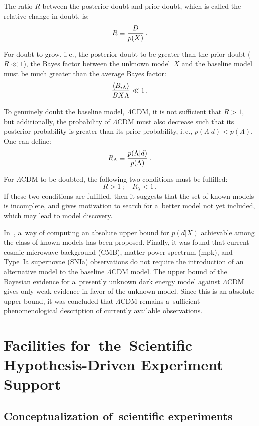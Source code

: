 \begin{multicols}{2}
  The ratio $R$ between the posterior doubt and prior doubt,
  which is called the relative change in doubt, is:
  $$
  R\equiv \displaystyle\frac{\displaystyle D\mathstrut}{\displaystyle p(X)\mathstrut}\,.
  $$

  For doubt to grow, i.\,e., the posterior doubt to be
  greater than the prior doubt ($R\ll 1$), the Bayes factor between
  the unknown model~$X$ and the baseline model must be much greater
  than the average Bayes factor:
  $$
  \displaystyle\frac{\displaystyle \langle B_{i\Lambda}\rangle\mathstrut}{\displaystyle BX\Lambda\mathstrut} \ll 1\,.
  $$

  To genuinely doubt the baseline model, $\Lambda$CDM, it is not sufficient that
$R > 1$, but additionally, the probability of $\Lambda$CDM must also decrease
such that its posterior probability is greater than its prior probability, i.\,e.,
$p(\Lambda \vert d) < p(\Lambda)$. One can define:
  $$
  R_\Lambda \equiv \displaystyle\frac{\displaystyle p(\Lambda\vert d)\mathstrut}{\displaystyle p(\Lambda)\mathstrut}\,.
  $$

  For $\Lambda$CDM to be doubted, the following two conditions must be fulfilled:
  $$
  R>1\,;\quad R_\lambda <1\,.
  $$
  If these two conditions are fulfilled, then it suggests that the set of
  known models is incomplete, and gives motivation to search for a~better
  model not yet included, which may lead to model discovery.

  In~\cite{41-kl}, a~way of computing an absolute upper bound for $p(d\vert X)$
achievable among the class of known models  has been proposed. Finally, it was
found that current cosmic microwave background (CMB), matter power spectrum
(mpk), and Type~Ia supernovae (SNIa) observations do not require the introduction of
an alternative model to the baseline $\Lambda$CDM model. The upper bound of the Bayesian evidence for a~presently unknown dark energy model against
$\Lambda$CDM gives only weak evidence in favor of the unknown model. Since
this is an absolute upper bound, it was concluded that $\Lambda$CDM remains a~sufficient phenomenological description of currently available observations.

\section{Facilities for~the~Scientific Hypothesis-Driven Experiment Support}
\subsection{Conceptualization of~scientific experiments}


\end{multicols}
